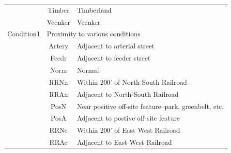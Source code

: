 \documentclass[11pt]{scrartcl} %
\begin{document}
\begin{center}
\begin{tabular}{c c c c c c}
\multicolumn{2}{|c}{} & \multicolumn{1}{c}{Timber} & \multicolumn{3}{l|}{Timberland}\\
\multicolumn{2}{|c}{} & \multicolumn{1}{c}{Veenker} & \multicolumn{3}{l|}{Veenker}\\
\hline
\multicolumn{2}{|c}{Condition1} & \multicolumn{4}{l|}{Proximity to various conditions}\\ 
\multicolumn{2}{|c}{} & \multicolumn{1}{c}{Artery} & \multicolumn{3}{l|}{Adjacent to arterial street}\\
\multicolumn{2}{|c}{} & \multicolumn{1}{c}{Feedr} & \multicolumn{3}{l|}{Adjacent to feeder street}\\
\multicolumn{2}{|c}{} & \multicolumn{1}{c}{Norm} & \multicolumn{3}{l|}{Normal}\\
\multicolumn{2}{|c}{} & \multicolumn{1}{c}{RRNn} & \multicolumn{3}{l|}{Within 200' of North-South Railroad}\\
\multicolumn{2}{|c}{} & \multicolumn{1}{c}{RRAn} & \multicolumn{3}{l|}{Adjacent to North-South Railroad}\\
\multicolumn{2}{|c}{} & \multicolumn{1}{c}{PosN} & \multicolumn{3}{l|}{Near positive off-site feature--park, greenbelt, etc.}\\
\multicolumn{2}{|c}{} & \multicolumn{1}{c}{PosA} & \multicolumn{3}{l|}{Adjacent to postive off-site feature}\\
\multicolumn{2}{|c}{} & \multicolumn{1}{c}{RRNe} & \multicolumn{3}{l|}{Within 200' of East-West Railroad}\\
\multicolumn{2}{|c}{} & \multicolumn{1}{c}{RRAe} & \multicolumn{3}{l|}{Adjacent to East-West Railroad}\\
\hline
\end{tabular}
\end{center}
\end{document}
